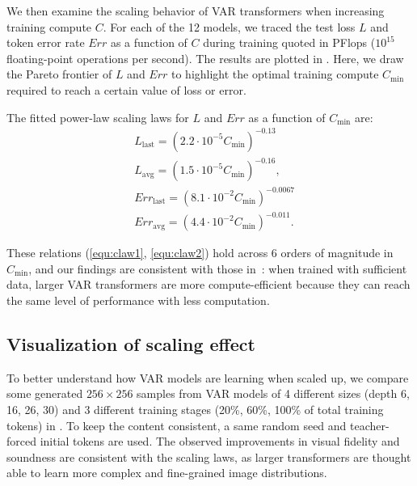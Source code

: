 We then examine the scaling behavior of VAR transformers when increasing training compute $C$.
For each of the 12 models, we traced the test loss $L$ and token error rate $Err$ as a function of $C$ during training quoted in PFlops ($10^{15}$ floating-point operations per second).
The results are plotted in .
Here, we draw the Pareto frontier of $L$ and $Err$ to highlight the optimal training compute $C_\text{min}$ required to reach a certain value of loss or error.

The fitted power-law scaling laws for $L$ and $Err$ as a function of $C_\text{min}$ are:
\begin{align}
    &L_\text{last} = (2.2 \cdot 10^{-5} C_\text{min})^{-0.13} \\
    &L_\text{avg} = (1.5 \cdot 10^{-5} C_\text{min})^{-0.16}, \label{equ:claw1} \\
    &Err_\text{last} = (8.1 \cdot 10^{-2} C_\text{min})^{-0.0067} \\
    &Err_\text{avg} = (4.4 \cdot 10^{-2} C_\text{min})^{-0.011}. \label{equ:claw2}
\end{align}

These relations (\ref{equ:claw1}, \ref{equ:claw2}) hold across 6 orders of magnitude in $C_\text{min}$, and our findings are consistent with those in~\cite{scalinglaw,scalingar}: when trained with sufficient data, larger VAR transformers are more compute-efficient because they can reach the same level of performance with less computation.



\subsection{Visualization of scaling effect} \label{sec:viss}
To better understand how VAR models are learning when scaled up, we compare some generated $256\times256$ samples from VAR models of 4 different sizes (depth 6, 16, 26, 30) and 3 different training stages (20\%, 60\%, 100\% of total training tokens) in .
To keep the content consistent, a same random seed and teacher-forced initial tokens are used.
The observed improvements in visual fidelity and soundness are consistent with the scaling laws, as larger transformers are thought able to learn more complex and fine-grained image distributions.




